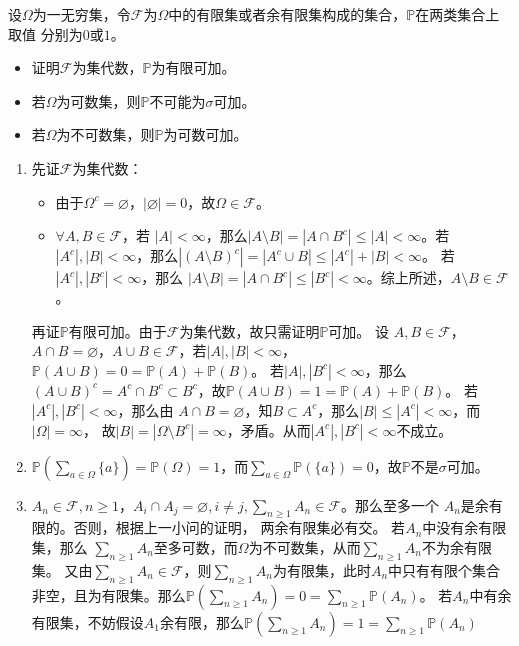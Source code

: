 \documentclass{ctexart}
\begin{document}
\begin{problem} 
  设\(\Omega \)为一无穷集，令\(\mathcal{F} \)为\(\Omega \)中的有限集或者余有限集构成的集合，\(\mathbb{P} \)在两类集合上取值
  分别为\(0 \)或\(1 \)。
  \begin{itemize}
    \item 证明\(\mathcal{F} \)为集代数，\(\mathbb{P} \)为有限可加。
    \item 若\(\Omega \)为可数集，则\(\mathbb{P} \)不可能为\(\sigma \)可加。
    \item 若\(\Omega \)为不可数集，则\(\mathbb{P} \)为可数可加。
  \end{itemize}
\end{problem}
\begin{solution}
 \begin{enumerate}
   \item 先证\(\mathcal{F} \)为集代数：
     \begin{itemize}
       \item 由于\(\Omega^c=\varnothing \)，\(|\varnothing| =0 \)，故\(\Omega \in \mathcal{F} \)。
       \item \(\forall A,B \in \mathcal{F} \)，若 \(|A|<\infty \)，那么\(|A\setminus B|=|A \cap B^c |\leq |A|<\infty \)。若\(|A^c|,|B|<\infty \)，那么\(|(A\setminus B)^c|=|A^c \cup B|\leq |A^c| + |B|< \infty \)。
         若\(|A^c|,|B^c| <\infty \)，那么 \(|A\setminus B|=|A \cap B^c|\leq |B^c|< \infty \)。综上所述，\(A\setminus B \in \mathcal{F} \)。
     \end{itemize}
    再证\(\mathbb{P} \)有限可加。由于\(\mathcal{F} \)为集代数，故只需证明\(\mathbb{P} \)可加。
    设 \(A,B \in \mathcal{F} \)，\(A \cap B =\varnothing \)，\(A \cup B \in \mathcal{F} \)，若\(|A|,|B| <\infty \)，\(\mathbb{P}(A \cup B) =0 = \mathbb{P}(A) + \mathbb{P}(B) \)。
     若\(|A|,|B^c|<\infty \)，那么\((A \cup B)^c=A^c \cap B^c \subset B^c \)，故\(\mathbb{P}(A \cup B)=1=\mathbb{P}(A) + \mathbb{P}(B) \)。
     若\(|A^c|,|B^c|< \infty \)，那么由 \(A \cap B=\varnothing\)，知\(B \subset A^c \)，那么\(|B| \leq |A^c|<\infty \)，而\(|\Omega|=\infty \)， 
     故\(|B|=|\Omega \setminus B^c|=\infty \)，矛盾。从而\(|A^c|,|B^c|<\infty \)不成立。
   \item \(\mathbb{P}(\sum_{a \in \Omega}\{a\})=\mathbb{P}(\Omega)=1 \)，而\(\sum_{a \in \Omega }\mathbb{P}(\{a\})=0 \)，故\(\mathbb{P} \)不是\(\sigma \)可加。
   \item \(A_n \in \mathcal{F}, n \geq 1 \)，\(A_i \cap A_j =\varnothing, i \neq j,\sum_{n \geq 1}A_n \in  \mathcal{F} \)。那么至多一个 \(A_n\)是余有限的。否则，根据上一小问的证明，
     两余有限集必有交。
     若\(A_n \)中没有余有限集，那么 \(\sum_{n \geq 1}A_n \)至多可数，而\(\Omega \)为不可数集，从而\(\sum_{n \geq 1}A_n \)不为余有限集。
     又由\(\sum_{n \geq 1}A_n \in \mathcal{F} \)，则\(\sum_{n \geq 1}A_n \)为有限集，此时\(A_n \)中只有有限个集合非空，且为有限集。那么\(\mathbb{P}(\sum_{n \geq 1}A_n)=0=\sum_{n \geq 1}\mathbb{P}(A_n) \)。
     若\(A_n \)中有余有限集，不妨假设\(A_1 \)余有限，那么\(\mathbb{P}(\sum_{n \geq 1}A_n)=1=\sum_{n \geq 1} \mathbb{P}(A_n) \)
 \end{enumerate}
\end{solution}
\end{document}
